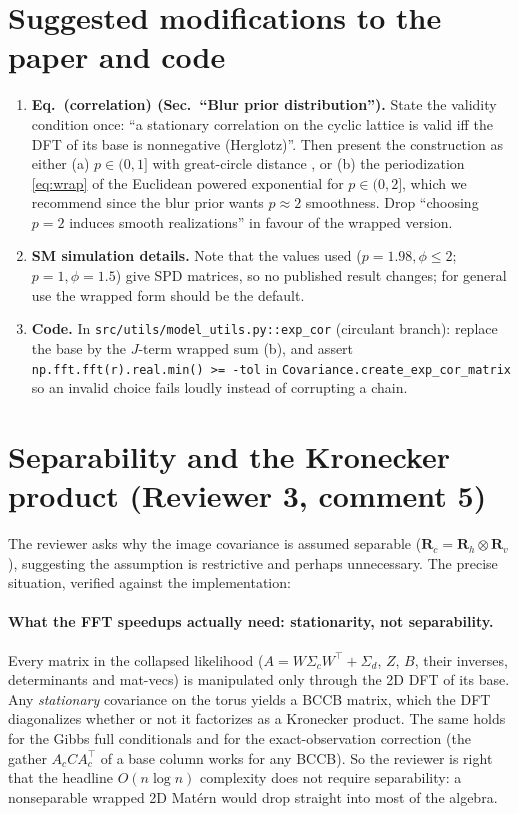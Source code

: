 \documentclass[11pt]{article}
\begin{document}
\section{Suggested modifications to the paper and code}

\begin{enumerate}
\item \textbf{Eq.~(correlation) (Sec.~``Blur prior distribution'').} State the
  validity condition once: ``a stationary correlation on the cyclic lattice
  is valid iff the DFT of its base is nonnegative (Herglotz)''. Then present
  the construction as either (a) $p \in (0,1]$ with great-circle distance
  \citep{Gneiting2013}, or (b) the periodization \eqref{eq:wrap} of the
  Euclidean powered exponential for $p \in (0,2]$, which we recommend since
  the blur prior wants $p \approx 2$ smoothness. Drop ``choosing $p=2$
  induces smooth realizations'' in favour of the wrapped version.
\item \textbf{SM simulation details.} Note that the values used
  ($p = 1.98, \phi \le 2$; $p = 1, \phi = 1.5$) give SPD matrices, so no
  published result changes; for general use the wrapped form should be the
  default.
\item \textbf{Code.} In \texttt{src/utils/model\_utils.py::exp\_cor}
  (circulant branch): replace the base by the $J$-term wrapped sum (b), and
  assert \texttt{np.fft.fft(r).real.min() >= -tol} in
  \texttt{Covariance.create\_exp\_cor\_matrix} so an invalid choice fails
  loudly instead of corrupting a chain.
\end{enumerate}

\section{Separability and the Kronecker product (Reviewer 3, comment 5)}

The reviewer asks why the image covariance is assumed separable
($\bm{R}_c = \bm{R}_h \otimes \bm{R}_v$), suggesting the assumption is
restrictive and perhaps unnecessary. The precise situation, verified against
the implementation:

\paragraph{What the FFT speedups actually need: stationarity, not
separability.} Every matrix in the collapsed likelihood
($A = W \Sigma_c W^{\top} + \Sigma_d$, $Z$, $B$, their inverses, determinants
and mat-vecs) is manipulated only through the 2D DFT of its base. Any
\emph{stationary} covariance on the torus yields a BCCB matrix, which the DFT
diagonalizes whether or not it factorizes as a Kronecker product. The same
holds for the Gibbs full conditionals and for the exact-observation
correction (the gather $A_c C A_c^{\top}$ of a base column works for any
BCCB). So the reviewer is right that the headline $O(n \log n)$ complexity
does not require separability: a nonseparable wrapped 2D Mat\'ern would drop
straight into most of the algebra.
\end{document}
